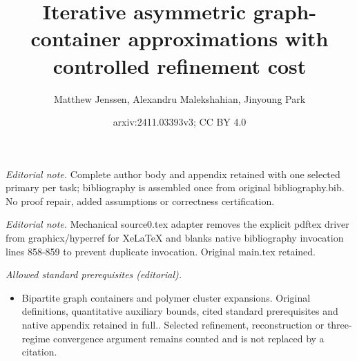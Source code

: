 \documentclass[10pt,a4paper]{amsart}
\title{Iterative asymmetric graph-container approximations with controlled refinement cost}
\author{Matthew Jenssen, Alexandru Malekshahian, Jinyoung Park}
\date{arxiv:2411.03393v3; CC BY 4.0}
\theoremstyle{definition}
\newcommand{\0}[0]{\emptyset}
\begin{document}
\maketitle
\noindent\textit{Editorial note.} Complete author body and appendix retained with one selected primary per task; bibliography is assembled once from original bibliography.bib. No proof repair, added assumptions or correctness certification.\par\medskip
\noindent\textit{Editorial note.} Mechanical source0.tex adapter removes the explicit pdftex driver from graphicx/hyperref for XeLaTeX and blanks native bibliography invocation lines 858-859 to prevent duplicate invocation. Original main.tex retained.\par\medskip
\noindent\textit{Allowed standard prerequisites (editorial).}\begin{itemize}
\item Bipartite graph containers and polymer cluster expansions. Original definitions, quantitative auxiliary bounds, cited standard prerequisites and native appendix retained in full.. Selected refinement, reconstruction or three-regime convergence argument remains counted and is not replaced by a citation.
\end{itemize}\medskip
\end{document}
